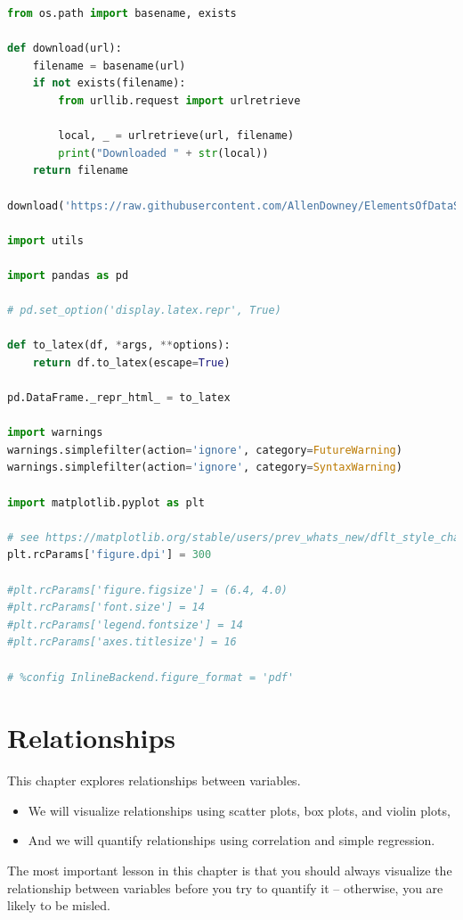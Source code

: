 \documentclass[
]{book}
\author{}
\date{}
\begin{document}
\frontmatter

\mainmatter
\begin{lstlisting}[language=Python]
from os.path import basename, exists

def download(url):
    filename = basename(url)
    if not exists(filename):
        from urllib.request import urlretrieve

        local, _ = urlretrieve(url, filename)
        print("Downloaded " + str(local))
    return filename

download('https://raw.githubusercontent.com/AllenDowney/ElementsOfDataScience/v1/utils.py')

import utils

import pandas as pd

# pd.set_option('display.latex.repr', True)

def to_latex(df, *args, **options):
    return df.to_latex(escape=True)

pd.DataFrame._repr_html_ = to_latex

import warnings
warnings.simplefilter(action='ignore', category=FutureWarning)
warnings.simplefilter(action='ignore', category=SyntaxWarning)

import matplotlib.pyplot as plt

# see https://matplotlib.org/stable/users/prev_whats_new/dflt_style_changes.html#figure-size-font-size-and-screen-dpi
plt.rcParams['figure.dpi'] = 300

#plt.rcParams['figure.figsize'] = (6.4, 4.0)
#plt.rcParams['font.size'] = 14
#plt.rcParams['legend.fontsize'] = 14
#plt.rcParams['axes.titlesize'] = 16

# %config InlineBackend.figure_format = 'pdf'
\end{lstlisting}

\chapter{Relationships}\label{relationships}

This chapter explores relationships between variables.

\begin{itemize}
\item
  We will visualize relationships using scatter plots, box plots, and
  violin plots,
\item
  And we will quantify relationships using correlation and simple
  regression.
\end{itemize}

The most important lesson in this chapter is that you should always
visualize the relationship between variables before you try to quantify
it -- otherwise, you are likely to be misled.
\end{document}
